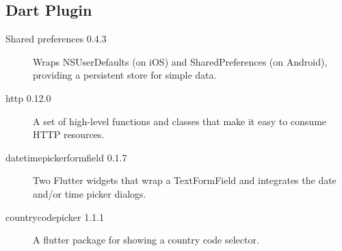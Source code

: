 \documentclass[../main.tex]{subfiles}
\begin{document}
\subsection{Dart Plugin}
{\begin{description}
	\item [Shared preferences 0.4.3] Wraps NSUserDefaults (on iOS) and SharedPreferences (on Android), providing a persistent store for simple data.
	\item [http 0.12.0] A set of high-level functions and classes that make it easy to consume HTTP resources.
	\item [datetime\textunderscore picker\textunderscore formfield 0.1.7] Two Flutter widgets that wrap a TextFormField and integrates the date and/or time picker dialogs.
	\item [country\textunderscore code\textunderscore picker 1.1.1] A flutter package for showing a country code selector.
\end{description}}
\end{document}
